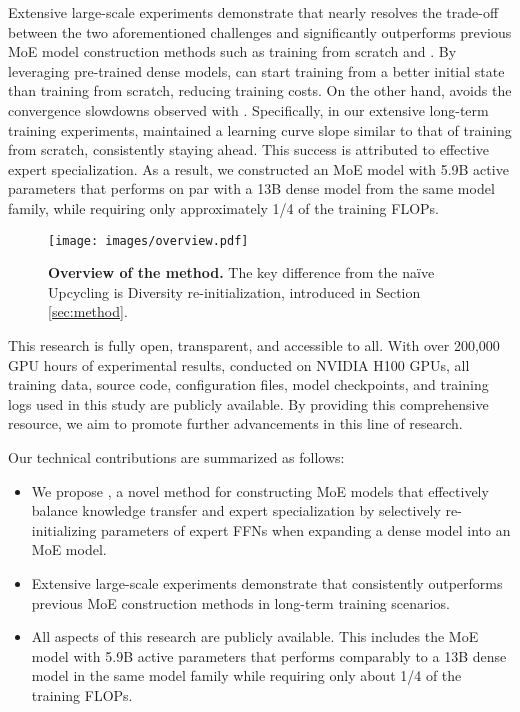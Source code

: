 %
%
Extensive large-scale experiments demonstrate that \methodname{} nearly resolves the trade-off between the two aforementioned challenges
and significantly outperforms previous MoE model construction methods such as training from scratch and \NUname{}.
By leveraging pre-trained dense models, \methodname{} can start training from a better initial state than training from scratch, reducing training costs.
On the other hand, \methodname{} avoids the convergence slowdowns observed with \NUname{}.
Specifically, in our extensive long-term training experiments, \methodname{} maintained a learning curve slope similar to that of training from scratch, consistently staying ahead.
This success is attributed to effective expert specialization.
As a result, we constructed an MoE model with 5.9B active parameters that performs on par with a 13B dense model from the same model family, while requiring only approximately 1/4 of the training FLOPs.

\begin{figure}[t]
    \centering
    \texttt{[image: images/overview.pdf]}
\vskip -8pt 
\caption{\textbf{Overview of the \methodname{} method.} The key difference from the na\"{i}ve Upcycling is Diversity re-initialization, introduced in Section \ref{sec:method}.}
    \label{fig:drop_upcycling}
\end{figure}

%
%
This research is fully open, transparent, and accessible to all.
With over 200,000 GPU hours of experimental results, conducted on NVIDIA H100 GPUs, all training data, source code, configuration files, model checkpoints, and training logs used in this study are publicly available. By providing this comprehensive resource, we aim to promote further advancements in this line of research.


%
%
%
Our technical contributions are summarized as follows:
\begin{itemize}
\item We propose \methodname{}, a novel method for constructing MoE models that effectively balance knowledge transfer and expert specialization by selectively re-initializing parameters of expert FFNs when expanding a dense model into an MoE model.

\item Extensive large-scale experiments demonstrate that \methodname{} consistently outperforms previous MoE construction methods in long-term training scenarios.

\item All aspects of this research are publicly available. %
This includes the MoE model with 5.9B active parameters that performs comparably to a 13B dense model in the same model family while requiring only about 1/4 of the training FLOPs.

\end{itemize}